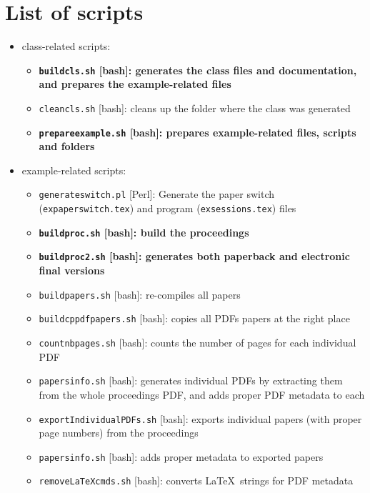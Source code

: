 \documentclass{article}
\newcommand{\file}[1]{\texttt{#1}}
\begin{document}
\section{List of scripts}

\begin{itemize}
  \item class-related scripts:
    \begin{itemize}
      \item {\bf \file{buildcls.sh} [bash]: generates the class files and documentation, and prepares the example-related files}
      \item \file{cleancls.sh} [bash]: cleans up the folder where the class was generated
      \item {\bf \file{prepareexample.sh} [bash]: prepares example-related files, scripts and folders}
    \end{itemize}
  \item example-related scripts:
    \begin{itemize}
      \item \file{generateswitch.pl} [Perl]: Generate the paper switch (\file{expaperswitch.tex}) and program (\file{exsessions.tex}) files
      \item {\bf \file{buildproc.sh} [bash]: build the proceedings}
      \item {\bf \file{buildproc2.sh} [bash]: generates both paperback and electronic final versions}
      \item \file{buildpapers.sh} [bash]: re-compiles all papers
      \item \file{buildcppdfpapers.sh} [bash]: copies all PDFs papers at the right place
      \item \file{countnbpages.sh} [bash]: counts the number of pages for each individual PDF 
      \item \file{papersinfo.sh} [bash]: generates individual PDFs by extracting them from the whole proceedings PDF, and adds proper PDF metadata to each
      \item \file{exportIndividualPDFs.sh} [bash]: exports individual papers (with proper page numbers) from the proceedings
      \item \file{papersinfo.sh} [bash]: adds proper metadata to exported papers
      \item \file{removeLaTeXcmds.sh} [bash]: converts \LaTeX\ strings for PDF metadata
    \end{itemize}
\end{itemize}
\end{document}
